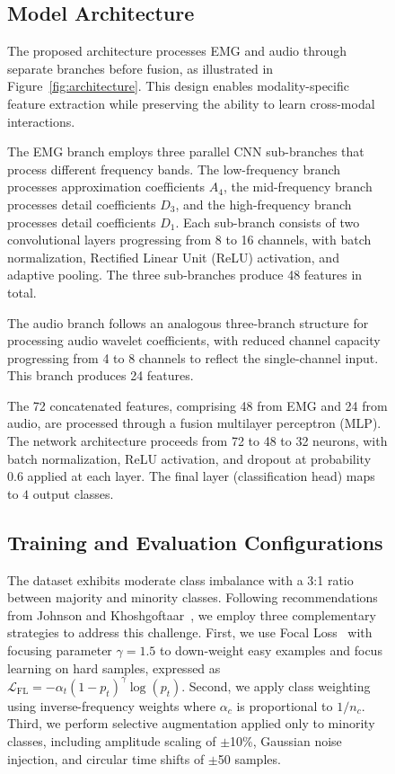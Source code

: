 \documentclass[pdflatex,sn-vancouver-num, iicol]{sn-jnl}
\begin{document}
\begin{figure}[h]
\subsection{Model Architecture}

The proposed architecture processes EMG and audio through separate branches before fusion, as illustrated in Figure~\ref{fig:architecture}. This design enables modality-specific feature extraction while preserving the ability to learn cross-modal interactions.

The EMG branch employs three parallel CNN sub-branches that process different frequency bands. The low-frequency branch processes approximation coefficients $A_4$, the mid-frequency branch processes detail coefficients $D_3$, and the high-frequency branch processes detail coefficients $D_1$. Each sub-branch consists of two convolutional layers progressing from 8 to 16 channels, with batch normalization, Rectified Linear Unit (ReLU) activation, and adaptive pooling. The three sub-branches produce 48 features in total.

The audio branch follows an analogous three-branch structure for processing audio wavelet coefficients, with reduced channel capacity progressing from 4 to 8 channels to reflect the single-channel input. This branch produces 24 features.

The 72 concatenated features, comprising 48 from EMG and 24 from audio, are processed through a fusion multilayer perceptron (MLP). The network architecture proceeds from 72 to 48 to 32 neurons, with batch normalization, ReLU activation, and dropout at probability 0.6 applied at each layer. The final layer (classification head) maps to $4$ output classes.



\subsection{Training and Evaluation Configurations}

The dataset exhibits moderate class imbalance with a 3:1 ratio between majority and minority classes. Following recommendations from Johnson and Khoshgoftaar~\cite{johnson2019survey}, we employ three complementary strategies to address this challenge. First, we use Focal Loss~\cite{lin2017focal} with focusing parameter $\gamma=1.5$ to down-weight easy examples and focus learning on hard samples, expressed as $\mathcal{L}_{\text{FL}} = -\alpha_t (1-p_t)^\gamma \log(p_t)$. Second, we apply class weighting using inverse-frequency weights where $\alpha_c$ is proportional to $1/n_c$. Third, we perform selective augmentation applied only to minority classes, including amplitude scaling of $\pm$10\%, Gaussian noise injection, and circular time shifts of $\pm$50 samples.


\end{figure}
\end{document}
